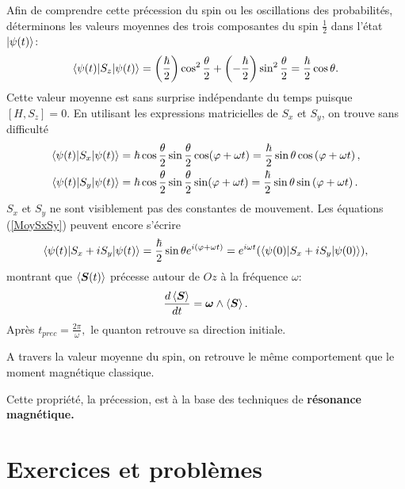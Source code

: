 Afin de comprendre cette précession du spin ou les oscillations des
probabilités, déterminons les valeurs moyennes des trois composantes du spin
$\frac{1}{2}$ dans l'état $\vert\psi(t)\rangle$:%
\begin{equation}
\langle\psi(t)\vert S_z\vert\psi(t)\rangle=
\left(\frac{\hbar}{2}\right)\cos^{2}\frac{\theta}{2}+\left(-\frac{\hbar}{2}
\right)\sin^{2}\frac{\theta}{2}=\frac{\hbar}{2} \cos\theta.
\end{equation}
Cette valeur moyenne est sans surprise indépendante du temps puisque
$[H,S_z]=0$. En utilisant les expressions matricielles de $S_{x}$ et $S_{y}$,
on trouve sans difficulté
\begin{subequations}%
\label{MoySxSy}%
\begin{align}
\langle\psi(t)\vert S_{x}\vert\psi(t)\rangle &
=\hbar\cos\frac{\theta}{2}\sin\frac{\theta}{2}\cos(\varphi+\omega t)
=\frac{\hbar}{2}\sin\theta\cos\left(\varphi+\omega t\right),\\
\langle\psi(t)\vert S_{y}\vert\psi(t)\rangle &
=\hbar\cos\frac{\theta}{2}\sin\frac{\theta}{2}\sin(\varphi+\omega t)
=\frac{\hbar}{2}\sin\theta\sin\left(\varphi+\omega t\right).
\end{align}%
\end{subequations}%
$S_{x}$ et $S_{y}$ ne sont visiblement pas des constantes de mouvement. Les
équations (\ref{MoySxSy}) peuvent encore s'écrire%
\begin{equation}
\langle\psi(t)\vert S_{x}+iS_{y}\vert\psi(t)\rangle =\frac{\hbar}{2}\sin\theta e^{i(\varphi
+\omega t)}=e^{i\omega t}(\langle\psi(0)\vert S_{x}+iS_{y}\vert\psi(0)\rangle),
\end{equation}
montrant que $\langle \boldsymbol{S}(t)\rangle$ précesse autour de $Oz$ à la
fréquence $\omega$:%
\begin{equation}
\frac{d\left\langle \boldsymbol{S}\right\rangle }{dt}=\boldsymbol{\omega
}\wedge\left\langle \boldsymbol{S}\right\rangle.
\end{equation}
Après $t_{prec}=\frac{2\pi}{\omega},$ le quanton retrouve sa direction initiale.

A travers la valeur moyenne du spin, on retrouve le même comportement que le
moment magnétique classique.

Cette propriété, la précession, est à la base des techniques de
\textbf{résonance magnétique.}

\newpage


\section{Exercices et problèmes}

